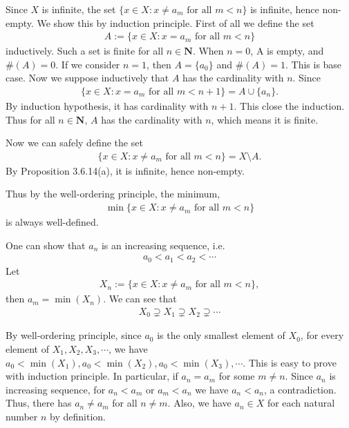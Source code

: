 \documentclass{book}
\begin{document}
Since $X$ is infinite, the set $\{x\in X:x\neq a_m\text{ for all }m<n\}$ is infinite, hence non-empty. We show this by induction principle. First of all we define the set
    \begin{align*}
        A:=\{x\in X:x=a_m\text{ for all }m<n\}
    \end{align*}
inductively. Such a set is finite for all $n\in\mathbf{N}$. When $n=0$, A is empty, and $\#(A)=0$. If we consider $n=1$, then $A=\{a_0\}$ and $\#(A)=1$. This is base case. Now we suppose inductively that $A$ has the cardinality with $n$. Since
    \begin{align*}
        \{x\in X:x=a_m\text{ for all }m<n+1\}=A\cup\{a_n\}.
    \end{align*}
By induction hypothesis, it has cardinality with $n+1$. This close the induction. Thus for all $n\in\mathbf{N}$, $A$ has the cardinality with $n$, which means it is finite.

Now we can safely define the set
    \begin{align*}
        \{x\in X:x\neq a_m\text{ for all }m<n\}=X\setminus A.
    \end{align*}
By Proposition 3.6.14(a), it is infinite, hence non-empty.

Thus by the well-ordering principle, the minimum, 
    \begin{align*}
        \min\{x\in X:x\neq a_m\text{ for all }m<n\}
    \end{align*}
is always well-defined.

One can show that $a_n$ is an increasing sequence, i.e.
    \begin{align*}
        a_0<a_1<a_2<\cdots
    \end{align*}
Let
    \begin{align*}
        X_n:=\{x\in X:x\neq a_m\text{ for all }m<n\},
    \end{align*}
then $a_m=\min(X_n)$. We can see that
    \begin{align*}
        X_0\supsetneq X_1\supsetneq X_2\supsetneq\cdots
    \end{align*}

By well-ordering principle, since $a_0$ is the only smallest element of $X_0$, for every element of $X_1,X_2,X_3,\cdots$, we have $a_0<\min(X_1),a_0<\min(X_2),a_0<\min(X_3),\cdots$. This is easy to prove with induction principle. In particular, if $a_n=a_m$ for some $m\neq n$. Since $a_n$ is increasing sequence, for $a_n<a_m$ or $a_m<a_n$ we have $a_n<a_n$, a contradiction. Thus, there has $a_n\neq a_m$ for all $n\neq m$. Also, we have $a_n\in X$ for each natural number $n$ by definition.
\end{document}
